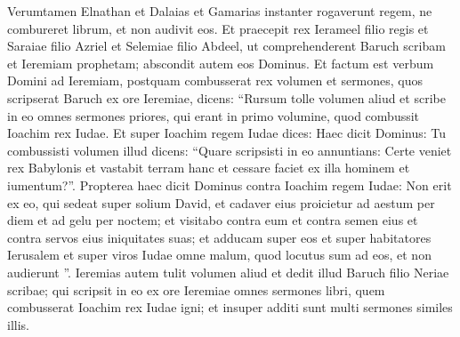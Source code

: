 \begin{biblechapter}
\begin{biblechapter}
\begin{biblechapter}
\begin{biblechapter}
\begin{biblechapter}
\begin{biblechapter}
\begin{biblechapter}
\begin{biblechapter}
\begin{biblechapter}
\begin{biblechapter}
\begin{biblechapter}
\begin{biblechapter}
\begin{biblechapter}
\begin{biblechapter}
\begin{biblechapter}
\begin{biblechapter}
\begin{biblechapter}
\begin{biblechapter}
\begin{biblechapter}
\begin{biblechapter}
\begin{biblechapter}
\begin{biblechapter}
\begin{biblechapter}
\begin{biblechapter}
\begin{biblechapter}
\begin{biblechapter}
\begin{biblechapter}
\begin{biblechapter}
\begin{biblechapter}
\begin{biblechapter}
\begin{biblechapter}
\begin{biblechapter}
\begin{biblechapter}
\begin{biblechapter}
\begin{biblechapter}
\begin{biblechapter}
\verse Verumtamen Elnathan et Dalaias et Gamarias instanter rogaverunt regem, ne combureret librum, et non audivit eos. 
\verse Et praecepit rex Ierameel filio regis et Saraiae filio Azriel et Selemiae filio Abdeel, ut comprehenderent Baruch scribam et Ieremiam prophetam; abscondit autem eos Dominus.
 \verse Et factum est verbum Domini ad Ieremiam, postquam combusserat rex volumen et sermones, quos scripserat Baruch ex ore Ieremiae, dicens: 
\verse “Rursum tolle volumen aliud et scribe in eo omnes sermones priores, qui erant in primo volumine, quod combussit Ioachim rex Iudae. 
\verse Et super Ioachim regem Iudae dices: Haec dicit Dominus: Tu combussisti volumen illud dicens: “Quare scripsisti in eo annuntians: Certe veniet rex Babylonis et vastabit terram hanc et cessare faciet ex illa hominem et iumentum?”. 
\verse Propterea haec dicit Dominus contra Ioachim regem Iudae: Non erit ex eo, qui sedeat super solium David, et cadaver eius proicietur ad aestum per diem et ad gelu per noctem; 
 \verse et visitabo contra eum et contra semen eius et contra servos eius iniquitates suas; et adducam super eos et super habitatores Ierusalem et super viros Iudae omne malum, quod locutus sum ad eos, et non audierunt ”.
 \verse Ieremias autem tulit volumen aliud et dedit illud Baruch filio Neriae scribae; qui scripsit in eo ex ore Ieremiae omnes sermones libri, quem combusserat Ioachim rex Iudae igni; et insuper additi sunt multi sermones similes illis.
 

\end{biblechapter}
\end{biblechapter}
\end{biblechapter}
\end{biblechapter}
\end{biblechapter}
\end{biblechapter}
\end{biblechapter}
\end{biblechapter}
\end{biblechapter}
\end{biblechapter}
\end{biblechapter}
\end{biblechapter}
\end{biblechapter}
\end{biblechapter}
\end{biblechapter}
\end{biblechapter}
\end{biblechapter}
\end{biblechapter}
\end{biblechapter}
\end{biblechapter}
\end{biblechapter}
\end{biblechapter}
\end{biblechapter}
\end{biblechapter}
\end{biblechapter}
\end{biblechapter}
\end{biblechapter}
\end{biblechapter}
\end{biblechapter}
\end{biblechapter}
\end{biblechapter}
\end{biblechapter}
\end{biblechapter}
\end{biblechapter}
\end{biblechapter}
\end{biblechapter}
